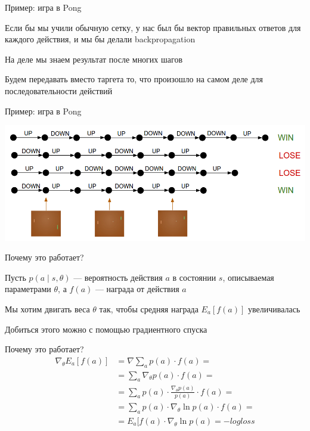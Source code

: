 \documentclass[notes,12pt, aspectratio=169]{beamer}
\newenvironment{wideitemize}{\itemize\addtolength{\itemsep}{10pt}}{\enditemize}
\begin{document}
\begin{frame}{Пример: игра в Pong}
\begin{wideitemize}
	\item   Если бы мы учили обычную сетку, у нас был бы вектор правильных ответов для каждого действия, и мы бы делали backpropagation 
	
	\item  На деле мы знаем результат после многих шагов
	
	\item  Будем передавать вместо таргета то, что произошло на самом деле для последовательности действий 
\end{wideitemize}
\end{frame}


\begin{frame}{Пример: игра в Pong}
\begin{center}
	\includegraphics[width=.8\linewidth]{pong_backprop.png}
\end{center}
\end{frame}


\begin{frame}{Почему это работает?}
\begin{wideitemize}
	\item   Пусть $p(a \mid s, \theta)$ --- вероятность действия $a$ в состоянии $s$, описываемая параметрами $\theta$, а $f(a)$ --- награда от действия $a$
	\item Мы хотим двигать веса $\theta$ так, чтобы средняя награда $E_a [ f(a)]$ увеличивалась
	\item Добиться этого можно с помощью градиентного спуска
\end{wideitemize}
\end{frame}


\begin{frame}{Почему это работает?}
\begin{equation*}
\begin{aligned}
\nabla_{\theta} E_a [f(a)] & = \nabla \sum_a p(a) \cdot f(a) = \\
& = \sum_{a} \nabla_{\theta} p(a) \cdot f(a) = \\
& = \sum_{a} p(a) \cdot \frac{\nabla_{\theta} p(a)}{p(a)} \cdot f(a) = \\
& = \sum_{a} p(a) \cdot \nabla_{\theta} \ln p(a) \cdot f(a) = \\
& = E_a [ f(a) \cdot \nabla_{\theta} \ln p(a) = - logloss \\
\end{aligned}
\end{equation*}
\end{frame}
\end{document}
